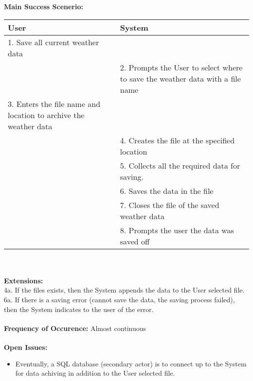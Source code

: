 \documentclass[letterpaper]{article}
\begin{document}
\textbf{Main Success Scenerio:  }\\
\begin{tabular}{|p{6cm}|p{6cm}|}\hline
\textbf{User} & \textbf{System}\\\hline
1.  Save all current weather data & \\\hline
& 2.  Prompts the User to select where to save the weather
data with a file name\\\hline
3.  Enters the file name and location to archive the weather
data & \\\hline
& 4.  Creates the file at the specified location\\\hline
& 5.  Collects all the required data for saving.\\\hline
& 6.  Saves the data in the file\\\hline
& 7.  Closes the file of the saved weather data\\\hline
& 8.  Prompts the user the data was saved off\\\hline
\end{tabular}\\\\
\textbf{Extensions:  }\\
4a.  If the files exists, then the System appends the data to the
User selected file.\\
6a.  If there is a saving error (cannot save the data, the saving
process failed), then the System indicates to the user of the
error.\\\\
\textbf{Frequency of Occurence:  }Almost continuous\\\\
\textbf{Open Issues:  }
\begin{itemize}
\item  Eventually, a SQL database (secondary actor) is to connect up
to the System for data achiving in addition to the User selected
file.
\end{itemize}
\end{document}
